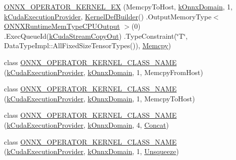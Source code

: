 \begin{DoxyCompactItemize}
\mbox{\hyperlink{namespaceonnxruntime_1_1cuda_ae657f01c4f8c9b9b6c80ed0d200559af}{O\+N\+N\+X\+\_\+\+O\+P\+E\+R\+A\+T\+O\+R\+\_\+\+K\+E\+R\+N\+E\+L\+\_\+\+EX}} (Memcpy\+To\+Host, \mbox{\hyperlink{namespaceonnxruntime_ac0e7c0c106a2c9e9594560a3ab289fa0}{k\+Onnx\+Domain}}, 1, \mbox{\hyperlink{namespaceonnxruntime_a73ebc64887ddd1968e3cef47ffefe35b}{k\+Cuda\+Execution\+Provider}}, \mbox{\hyperlink{classonnxruntime_1_1KernelDefBuilder}{Kernel\+Def\+Builder}}() .Output\+Memory\+Type$<$ \mbox{\hyperlink{allocator__info_8h_add3f8ee3ff93395704abae71c30cab18a59888d12290735245a1b8afb40f64331}{O\+N\+N\+X\+Runtime\+Mem\+Type\+C\+P\+U\+Output}} $>$(0) .Exec\+Queue\+Id(\mbox{\hyperlink{namespaceonnxruntime_a43d7a39c044fbc3f2147feb0f958dfc5af156736a4e02a015cda5dba140f8337a}{k\+Cuda\+Stream\+Copy\+Out}}) .Type\+Constraint(\char`\"{}T\char`\"{}, Data\+Type\+Impl\+::\+All\+Fixed\+Size\+Tensor\+Types()), \mbox{\hyperlink{classonnxruntime_1_1Memcpy}{Memcpy}})
\item 
class \mbox{\hyperlink{namespaceonnxruntime_1_1cuda_a830331b8018edc343f1a17f4a7351619}{O\+N\+N\+X\+\_\+\+O\+P\+E\+R\+A\+T\+O\+R\+\_\+\+K\+E\+R\+N\+E\+L\+\_\+\+C\+L\+A\+S\+S\+\_\+\+N\+A\+ME}} (\mbox{\hyperlink{namespaceonnxruntime_a73ebc64887ddd1968e3cef47ffefe35b}{k\+Cuda\+Execution\+Provider}}, \mbox{\hyperlink{namespaceonnxruntime_ac0e7c0c106a2c9e9594560a3ab289fa0}{k\+Onnx\+Domain}}, 1, Memcpy\+From\+Host)
\item 
class \mbox{\hyperlink{namespaceonnxruntime_1_1cuda_ab9ee46d2d5baf219f316db19d06f54ee}{O\+N\+N\+X\+\_\+\+O\+P\+E\+R\+A\+T\+O\+R\+\_\+\+K\+E\+R\+N\+E\+L\+\_\+\+C\+L\+A\+S\+S\+\_\+\+N\+A\+ME}} (\mbox{\hyperlink{namespaceonnxruntime_a73ebc64887ddd1968e3cef47ffefe35b}{k\+Cuda\+Execution\+Provider}}, \mbox{\hyperlink{namespaceonnxruntime_ac0e7c0c106a2c9e9594560a3ab289fa0}{k\+Onnx\+Domain}}, 1, Memcpy\+To\+Host)
\item 
class \mbox{\hyperlink{namespaceonnxruntime_1_1cuda_afcc333c99a69d2d026aaaac8d4a15480}{O\+N\+N\+X\+\_\+\+O\+P\+E\+R\+A\+T\+O\+R\+\_\+\+K\+E\+R\+N\+E\+L\+\_\+\+C\+L\+A\+S\+S\+\_\+\+N\+A\+ME}} (\mbox{\hyperlink{namespaceonnxruntime_a73ebc64887ddd1968e3cef47ffefe35b}{k\+Cuda\+Execution\+Provider}}, \mbox{\hyperlink{namespaceonnxruntime_ac0e7c0c106a2c9e9594560a3ab289fa0}{k\+Onnx\+Domain}}, 4, \mbox{\hyperlink{classonnxruntime_1_1cuda_1_1Concat}{Concat}})
\item 
class \mbox{\hyperlink{namespaceonnxruntime_1_1cuda_ab339249afeba9b3c5bb3fe2a182eb5d8}{O\+N\+N\+X\+\_\+\+O\+P\+E\+R\+A\+T\+O\+R\+\_\+\+K\+E\+R\+N\+E\+L\+\_\+\+C\+L\+A\+S\+S\+\_\+\+N\+A\+ME}} (\mbox{\hyperlink{namespaceonnxruntime_a73ebc64887ddd1968e3cef47ffefe35b}{k\+Cuda\+Execution\+Provider}}, \mbox{\hyperlink{namespaceonnxruntime_ac0e7c0c106a2c9e9594560a3ab289fa0}{k\+Onnx\+Domain}}, 1, \mbox{\hyperlink{classonnxruntime_1_1cuda_1_1Unsqueeze}{Unsqueeze}})

\end{DoxyCompactItemize}
